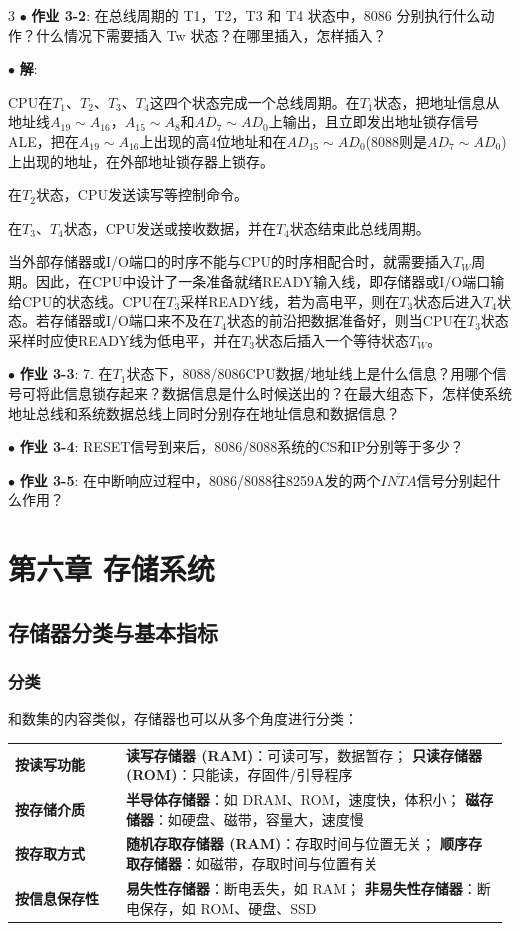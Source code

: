 \documentclass[10pt, a4paper, landscape]{article}
\makeatletter
\newcommand{\blue}[1]{\textbf{\textcolor{myblue}{#1}}}
\newcommand{\green}[1]{\textbf{\textcolor{mygreen}{#1}}}
\newcommand{\entry}[2]{$\bullet$ \textbf{#1}: #2\par\vspace{0.5pt}}
\newcommand{\concepttable}[1]{%
    {\setlength{\tabcolsep}{1.5pt}%
     \renewcommand{\arraystretch}{0.92}%
     \par\vspace{2pt}{\color{myblue}\hrule height 0.6pt}\vspace{1pt}%
     \noindent\begin{tabular}{@{}p{0.22\linewidth}p{0.76\linewidth}@{}}%
     #1%
     \end{tabular}%
     \vspace{1pt}{\color{myblue}\hrule height 0.6pt}\par\vspace{2pt}}%
}
\newcommand{\conrow}[2]{\blue{#1} & #2 \\}
\makeatother
\begin{document}
\begin{multicols*}{3}
\entry{\green{作业 3-2}}{在总线周期的 T1，T2，T3 和 T4 状态中，8086 分别执行什么动作？什么情况下需要插入 Tw 状态？在哪里插入，怎样插入？}

\entry{解}{

CPU在$T_1$、$T_2$、$T_3$、$T_4$这四个状态完成一个总线周期。在$T_1$状态，把地址信息从地址线$A_{19}\sim A_{16}$，$A_{15}\sim A_8$和$AD_7\sim AD_0$上输出，且立即发出地址锁存信号ALE，把在$A_{19}\sim A_{16}$上出现的高4位地址和在$AD_{15}\sim AD_0$(8088则是$AD_7\sim AD_0$)上出现的地址，在外部地址锁存器上锁存。

在$T_2$状态，CPU发送读写等控制命令。

在$T_3$、$T_4$状态，CPU发送或接收数据，并在$T_4$状态结束此总线周期。

当外部存储器或I/O端口的时序不能与CPU的时序相配合时，就需要插入$T_W$周期。因此，在CPU中设计了一条准备就绪READY输入线，即存储器或I/O端口输给CPU的状态线。CPU在$T_3$采样READY线，若为高电平，则在$T_3$状态后进入$T_4$状态。若存储器或I/O端口来不及在$T_4$状态的前沿把数据准备好，则当CPU在$T_3$状态采样时应使READY线为低电平，并在$T_3$状态后插入一个等待状态$T_W$。

}

\entry{作业 3-3}{7. 在$T_1$状态下，8088/8086CPU数据/地址线上是什么信息？用哪个信号可将此信息锁存起来？数据信息是什么时候送出的？在最大组态下，怎样使系统地址总线和系统数据总线上同时分别存在地址信息和数据信息？}



\entry{作业 3-4}{RESET信号到来后，8086/8088系统的CS和IP分别等于多少？}



\entry{作业 3-5}{在中断响应过程中，8086/8088往8259A发的两个$\overline{INTA}$信号分别起什么作用？}


\section{第六章 存储系统}

\subsection{存储器分类与基本指标}

\subsubsection{分类}

和数集的内容类似，存储器也可以从多个角度进行分类：

\concepttable{
    \conrow{按读写功能}{\blue{读写存储器 (RAM)}：可读可写，数据暂存；
        \blue{只读存储器 (ROM)}：只能读，存固件/引导程序}
    \conrow{按存储介质}{\blue{半导体存储器}：如 DRAM、ROM，速度快，体积小；
        \blue{磁存储器}：如硬盘、磁带，容量大，速度慢}
    \conrow{按存取方式}{\blue{随机存取存储器 (RAM)}：存取时间与位置无关；
        \blue{顺序存取存储器}：如磁带，存取时间与位置有关}
    \conrow{按信息保存性}{\blue{易失性存储器}：断电丢失，如 RAM；
        \blue{非易失性存储器}：断电保存，如 ROM、硬盘、SSD}
}


\end{multicols*}
\end{document}

